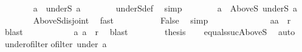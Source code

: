 \begin{isabellebody}
\ \ \ \ \ \ \isamarkupfalse%
\ {\isachardoublequoteopen}a{\isacharprime}{\kern0pt}\ {\isasymin}\ underS\ a{\isachardoublequoteclose}\isanewline
\ \ \ \ \ \ \isamarkupfalse%
\ underS{\isacharunderscore}{\kern0pt}def\ \isamarkupfalse%
\ simp\isanewline
\ \ \ \ \ \ \isamarkupfalse%
\ {\isachardoublequoteopen}a{\isacharprime}{\kern0pt}\ {\isasymnotin}\ AboveS\ {\isacharparenleft}{\kern0pt}underS\ a{\isacharparenright}{\kern0pt}{\isachardoublequoteclose}\isanewline
\ \ \ \ \ \ \isamarkupfalse%
\ AboveS{\isacharunderscore}{\kern0pt}disjoint\ \isamarkupfalse%
\ fast\isanewline
\ \ \ \ \ \ \isamarkupfalse%
\ {\isacharasterisk}{\kern0pt}\ \isamarkupfalse%
\ False\ \isamarkupfalse%
\ simp\isanewline
\ \ \ \ \ \isacommand{{\isacharbraceright}{\kern0pt}}\isamarkupfalse%
\isanewline
\ \ \ \ \ \isamarkupfalse%
\ \isamarkupfalse%
\ {\isachardoublequoteopen}{\isacharparenleft}{\kern0pt}a{\isacharcomma}{\kern0pt}a{\isacharprime}{\kern0pt}{\isacharparenright}{\kern0pt}\ {\isasymin}\ r{\isachardoublequoteclose}\ \isamarkupfalse%
\ blast\isanewline
\ \ \ \ \isacommand{{\isacharbraceright}{\kern0pt}}\isamarkupfalse%
\isanewline
\ \ \ \ \isamarkupfalse%
\ \ {\isachardoublequoteopen}{\isacharparenleft}{\kern0pt}a{\isacharcomma}{\kern0pt}\ a{\isacharprime}{\kern0pt}{\isacharparenright}{\kern0pt}\ {\isasymin}\ r{\isachardoublequoteclose}\ \isamarkupfalse%
\ blast\isanewline
\ \ \isamarkupfalse%
\isanewline
\ \ \isamarkupfalse%
\ \isamarkupfalse%
\ {\isacharquery}{\kern0pt}thesis\isanewline
\ \ \isamarkupfalse%
\ equals{\isacharunderscore}{\kern0pt}suc{\isacharunderscore}{\kern0pt}AboveS\ \isamarkupfalse%
\ auto\isanewline
{}\isamarkupfalse%
%
\endisatagproof
{\isafoldproof}%
%
\isadelimproof
%
\endisadelimproof
%
\isadelimdocument
%
\endisadelimdocument
%
\isatagdocument
%
\isamarkuptrue%
%
\endisatagdocument
{\isafolddocument}%
%
\isadelimdocument
%
\endisadelimdocument
{}\isamarkupfalse%
\ under{\isacharunderscore}{\kern0pt}ofilter{\isacharcolon}{\kern0pt}\isanewline
{\isachardoublequoteopen}ofilter\ {\isacharparenleft}{\kern0pt}under\ a{\isacharparenright}{\kern0pt}{\isachardoublequoteclose}\isanewline
%
\isadelimproof
%
\endisadelimproof
%
\isatagproof
{}\isamarkupfalse%

\end{isabellebody}
